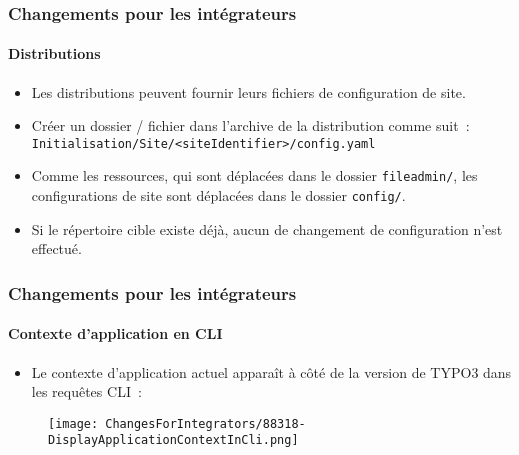 
\begin{frame}[fragile]
	\frametitle{Changements pour les intégrateurs}
	\framesubtitle{Distributions}

	\lstset{basicstyle=\tiny\ttfamily}

	\begin{itemize}
		\item Les distributions peuvent fournir leurs fichiers de configuration de site.

		\item Créer un dossier / fichier dans l'archive de la distribution comme suit~:\newline
			\texttt{Initialisation/Site/<siteIdentifier>/config.yaml}

		\item Comme les ressources, qui sont déplacées dans le dossier \texttt{fileadmin/},\newline
			les configurations de site sont déplacées dans le dossier \texttt{config/}.

		\item Si le répertoire cible existe déjà, aucun de changement de configuration n'est effectué.
	\end{itemize}

\end{frame}


\begin{frame}[fragile]
	\frametitle{Changements pour les intégrateurs}
	\framesubtitle{Contexte d'application en CLI}

	\begin{itemize}
		\item Le contexte d'application actuel apparaît à côté de la version de
			TYPO3 dans les requêtes CLI~:
	\end{itemize}

	\begin{figure}
		\texttt{[image: ChangesForIntegrators/88318-DisplayApplicationContextInCli.png]}
	\end{figure}

\end{frame}

